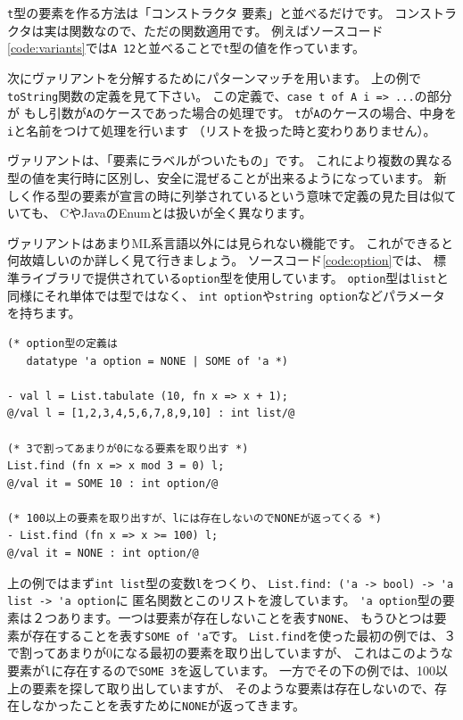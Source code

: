 \documentclass[11pt,a4paper]{article}
\begin{document}
\lstinline{t}型の要素を作る方法は「コンストラクタ 要素」と並べるだけです。
コンストラクタは実は関数なので、ただの関数適用です。
例えばソースコード\ref{code:variants}では\lstinline{A 12}と並べることで\lstinline{t}型の値を作っています。

次にヴァリアントを分解するためにパターンマッチを用います。
上の例で\lstinline{toString}関数の定義を見て下さい。
この定義で、\lstinline{case t of A i => ...}の部分が
もし引数が\lstinline{A}のケースであった場合の処理です。
\lstinline{t}が\lstinline{A}のケースの場合、中身を\lstinline{i}と名前をつけて処理を行います
（リストを扱った時と変わりありません）。

ヴァリアントは、「要素にラベルがついたもの」です。
これにより複数の異なる型の値を実行時に区別し、安全に混ぜることが出来るようになっています。
新しく作る型の要素が宣言の時に列挙されているという意味で定義の見た目は似ていても、
CやJavaのEnumとは扱いが全く異なります。

ヴァリアントはあまりML系言語以外には見られない機能です。
これができると何故嬉しいのか詳しく見て行きましょう。
ソースコード\ref{code:option}では、
標準ライブラリで提供されている\lstinline{option}型を使用しています。
\lstinline{option}型は\lstinline{list}と同様にそれ単体では型ではなく、
\lstinline{int option}や\lstinline{string option}などパラメータを持ちます。

\begin{lstlisting}[caption=オプション型,label=code:option]
(* option型の定義は
   datatype 'a option = NONE | SOME of 'a *)

- val l = List.tabulate (10, fn x => x + 1);
@/val l = [1,2,3,4,5,6,7,8,9,10] : int list/@

(* 3で割ってあまりが0になる要素を取り出す *)
List.find (fn x => x mod 3 = 0) l;
@/val it = SOME 10 : int option/@

(* 100以上の要素を取り出すが、lには存在しないのでNONEが返ってくる *)
- List.find (fn x => x >= 100) l;
@/val it = NONE : int option/@
\end{lstlisting}

上の例ではまず\lstinline{int list}型の変数\lstinline{l}をつくり、
\lstinline{List.find: ('a -> bool) -> 'a list -> 'a option}に
匿名関数とこのリストを渡しています。
\lstinline{'a option}型の要素は２つあります。一つは要素が存在しないことを表す\lstinline{NONE}、
もうひとつは要素が存在することを表す\lstinline{SOME of 'a}です。
\lstinline{List.find}を使った最初の例では、３で割ってあまりが0になる最初の要素を取り出していますが、
これはこのような要素が\lstinline{l}に存在するので\lstinline{SOME 3}を返しています。
一方でその下の例では、100以上の要素を探して取り出していますが、
そのような要素は存在しないので、存在しなかったことを表すために\lstinline{NONE}が返ってきます。
\end{document}
